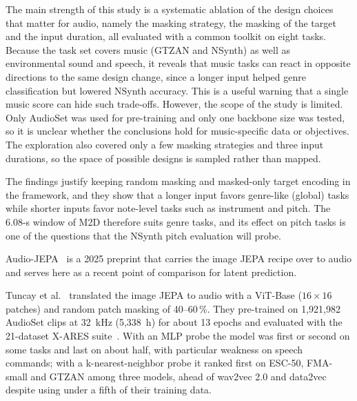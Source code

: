\documentclass{FastFyp}
\begin{document}
\lrcritical
The main strength of this study is a systematic ablation of the design choices that matter for audio, namely the masking strategy, the masking of the target and the input duration, all evaluated with a common toolkit on eight tasks. Because the task set covers music (GTZAN and NSynth) as well as environmental sound and speech, it reveals that music tasks can react in opposite directions to the same design change, since a longer input helped genre classification but lowered NSynth accuracy. This is a useful warning that a single music score can hide such trade-offs. However, the scope of the study is limited. Only AudioSet was used for pre-training and only one backbone size was tested, so it is unclear whether the conclusions hold for music-specific data or objectives. The exploration also covered only a few masking strategies and three input durations, so the space of possible designs is sampled rather than mapped.

\lrrelation
The findings justify keeping random masking and masked-only target encoding in the framework, and they show that a longer input favors genre-like (global) tasks while shorter inputs favor note-level tasks such as instrument and pitch. The 6.08-s window of M2D therefore suits genre tasks, and its effect on pitch tasks is one of the questions that the NSynth pitch evaluation will probe.

Audio-JEPA~\cite{ref:Tuncay:2025audiojepa} is a 2025 preprint that carries the image JEPA recipe over to audio and serves here as a recent point of comparison for latent prediction.

\lrsummary
Tuncay et al.~\cite{ref:Tuncay:2025audiojepa} translated the image JEPA to audio with a ViT-Base ($16\times16$ patches) and random patch masking of 40--60\,\%. They pre-trained on 1,921,982 AudioSet clips at 32~kHz (5,338~h) for about 13 epochs and evaluated with the 21-dataset X-ARES suite~\cite{ref:XARESGit}. With an MLP probe the model was first or second on some tasks and last on about half, with particular weakness on speech commands; with a k-nearest-neighbor probe it ranked first on ESC-50, FMA-small and GTZAN among three models, ahead of wav2vec 2.0 and data2vec despite using under a fifth of their training data.
\end{document}
